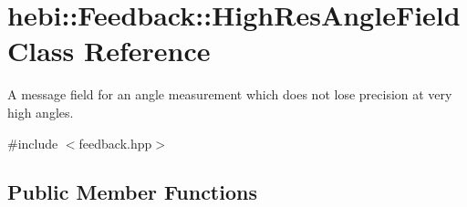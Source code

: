 \hypertarget{classhebi_1_1Feedback_1_1HighResAngleField}{}\section{hebi\+:\+:Feedback\+:\+:High\+Res\+Angle\+Field Class Reference}
\label{classhebi_1_1Feedback_1_1HighResAngleField}


A message field for an angle measurement which does not lose precision at very high angles.  




{\ttfamily \#include $<$feedback.\+hpp$>$}

\subsection*{Public Member Functions}
